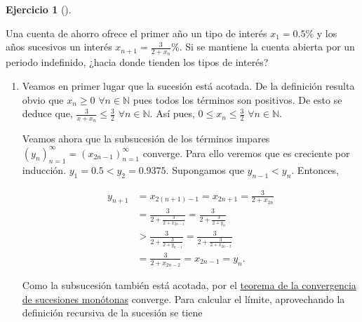 \documentclass[
  a4paper,
]{scrreport}
\theoremstyle{definition}
\newtheorem{exercise}{Ejercicio}[chapter]
\theoremstyle{remark}
\begin{document}
\leavevmode{}%
\begin{exercise}[]\label{exr-sucesion-intereses}

Una cuenta de ahorro ofrece el primer año un tipo de interés
\(x_1=0.5\%\) y los años sucesivos un interés
\(x_{n+1}=\frac{3}{2+x_n}\%\). Si se mantiene la cuenta abierta por un
periodo indefinido, ¿hacia donde tienden los tipos de interés?

\end{exercise}

\begin{tcolorbox}[enhanced jigsaw, coltitle=black, left=2mm, opacityback=0, colback=white, opacitybacktitle=0.6, breakable, colbacktitle=quarto-callout-tip-color!10!white, leftrule=.75mm, toptitle=1mm, arc=.35mm, bottomtitle=1mm, rightrule=.15mm, titlerule=0mm, title=\textcolor{quarto-callout-tip-color}{\faLightbulb}\hspace{0.5em}{Solución}, colframe=quarto-callout-tip-color-frame, toprule=.15mm, bottomrule=.15mm]

\begin{enumerate}
\def\labelenumi{\alph{enumi}.}
\item
  Veamos en primer lugar que la sucesión está acotada. De la definición
  resulta obvio que \(x_n\geq 0\) \(\forall n\in\mathbb{N}\) pues todos
  los términos son positivos. De esto se deduce que,
  \(\frac{3}{x+x_n}\leq \frac{3}{2}\) \(\forall n\in\mathbb{N}\). Así
  pues, \(0\leq x_n\leq \frac{3}{2}\) \(\forall n\in\mathbb{N}\).

  Veamos ahora que la subsucesión de los términos impares
  \((y_n)_{n=1}^\infty = (x_{2n-1})_{n=1}^\infty\) converge. Para ello
  veremos que es creciente por inducción. \(y_1=0.5<y_2=0.9375\).
  Supongamos que \(y_{n-1}<y_n\). Entonces,

  \begin{align*}
   y_{n+1} &= x_{2(n+1)-1} = x_{2n+1} = \frac{3}{2+x_{2n}} \\ 
   &= \frac{3}{2+\frac{3}{2+x_{2n-1}}} = \frac{3}{2+\frac{3}{2+y_n}} \\ 
   &> \frac{3}{2+\frac{3}{2+y_{n-1}}} = \frac{3}{2+\frac{3}{2+x_{2n-3}}} \\
   &= \frac{3}{2+x_{2n-2}} = x_{2n-1} = y_n.
   \end{align*}

  Como la subsucesión también está acotada, por el
  \href{https://aprendeconalf.es/analisis-manual/sucesiones.html\#thm-convergencia-monotona}{teorema
  de la convergencia de sucesiones monótonas} converge. Para calcular el
  límite, aprovechando la definición recursiva de la sucesión se tiene


\end{enumerate}
\end{tcolorbox}
\end{document}
